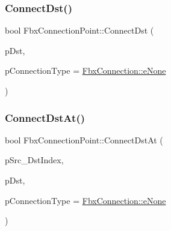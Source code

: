 \subsubsection{\texorpdfstring{Connect\+Dst()}{ConnectDst()}}
{\footnotesize\ttfamily bool Fbx\+Connection\+Point\+::\+Connect\+Dst (\begin{DoxyParamCaption}\item[{\hyperlink{class_fbx_connection_point}{Fbx\+Connection\+Point} $\ast$}]{p\+Dst,  }\item[{\hyperlink{class_fbx_connection_a3df448a5db356652ab99fd2be2553749}{Fbx\+Connection\+::\+E\+Type}}]{p\+Connection\+Type = {\ttfamily \hyperlink{class_fbx_connection_a3df448a5db356652ab99fd2be2553749a47aa04870c3c0769263e3972e67e9ebe}{Fbx\+Connection\+::e\+None}} }\end{DoxyParamCaption})}

\mbox{\label{class_fbx_connection_point_a9ae5fee9358b0d3b107ea9dbd4447e81}} 
\subsubsection{\texorpdfstring{Connect\+Dst\+At()}{ConnectDstAt()}}
{\footnotesize\ttfamily bool Fbx\+Connection\+Point\+::\+Connect\+Dst\+At (\begin{DoxyParamCaption}\item[{int}]{p\+Src\+\_\+\+Dst\+Index,  }\item[{\hyperlink{class_fbx_connection_point}{Fbx\+Connection\+Point} $\ast$}]{p\+Dst,  }\item[{\hyperlink{class_fbx_connection_a3df448a5db356652ab99fd2be2553749}{Fbx\+Connection\+::\+E\+Type}}]{p\+Connection\+Type = {\ttfamily \hyperlink{class_fbx_connection_a3df448a5db356652ab99fd2be2553749a47aa04870c3c0769263e3972e67e9ebe}{Fbx\+Connection\+::e\+None}} }\end{DoxyParamCaption})}

\mbox{\label{class_fbx_connection_point_a67f4175670b447cc8d1362905ad79ac6}} 
